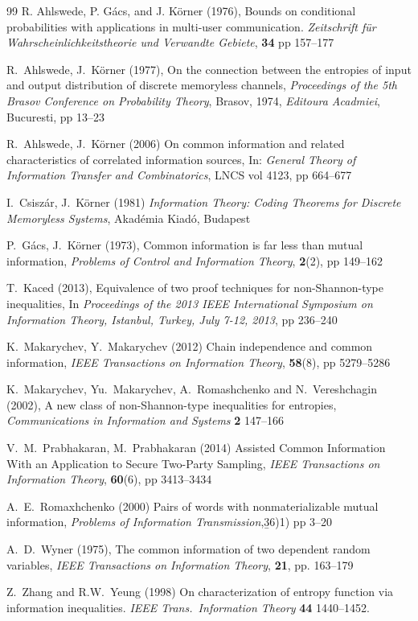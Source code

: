 \documentclass{IEEEtran}
\begin{document}
\begin{thebibliography}{99}
R. Ahlswede, P. Gács, and J. Körner (1976),
Bounds on conditional probabilities with applications in multi-user communication.
\emph{Zeitschrift für Wahrscheinlichkeitstheorie und Verwandte Gebiete}, 
{\bf 34} pp 157--177

R.~Ahlswede, J.~K\"orner (1977),
\newblock
On the connection between the entropies of input and output distribution of
discrete memoryless channels,
\newblock
\emph{Proceedings of the 5th Brasov Conference on Probability Theory},
Brasov, 1974, \emph{Editoura Acadmiei}, Bucuresti, pp 13--23

R.~Ahlswede, J.~K\"orner (2006)
On common information and related characteristics of correlated information
sources,
In: \emph{General Theory of Information Transfer and Combinatorics}, 
LNCS vol 4123, pp 664--677

I.~Csisz\'ar, J.~K\"orner (1981)
\emph{Information Theory: Coding Theorems for Discrete Memoryless Systems},
Akad\'emia Kiad\'o, Budapest

P.~G\'acs, J.~K\"orner (1973), 
Common information is far less than mutual information,
\emph{Problems of Control and Information Theory}, {\bf 2}(2), pp 149--162

T.~Kaced (2013),
Equivalence of two proof techniques for non-Shannon-type inequalities,
In \emph{Proceedings of the 2013 {IEEE} International Symposium on Information
                  Theory, Istanbul, Turkey, July 7-12, 2013},
  pp 236--240

K.~Makarychev, Y.~Makarychev (2012)
Chain independence and common information,
\emph{IEEE Transactions on Information Theory}, {\bf58}(8), pp 5279--5286

K.~Makarychev, Yu.~Makarychev, A.~Romashchenko and N.~Vereshchagin (2002),
A new class of non-Shannon-type inequalities for entropies,
\emph{Communications in Information and Systems} {\bf 2} 147--166

V.~M.~Prabhakaran, M.~Prabhakaran (2014)
Assisted Common Information With an Application to Secure Two-Party
                  Sampling,
\emph{IEEE Transactions on Information Theory}, {\bf60}(6), pp 3413--3434

A.~E.~Romaxhchenko (2000)
Pairs of words with nonmaterializable mutual information,
\emph{Problems of Information Transmission},{\b 36})1) pp 3--20

A.~D.~Wyner (1975),
The common information of two dependent random variables,
\emph{IEEE Transactions on Information Theory}, {\bf 21}, pp. 163--179


 Z.~Zhang and R.W.~Yeung (1998)
    On characterization of entropy function via information inequalities.
    \emph{IEEE Trans.\ Information Theory} {\bf 44} 1440--1452.


\end{thebibliography}
\end{document}
